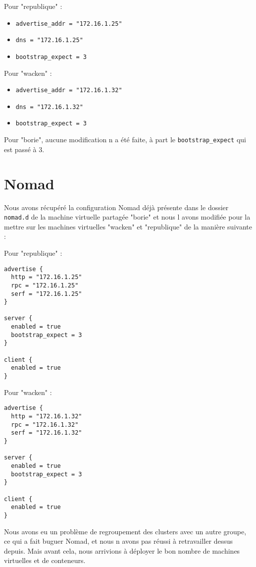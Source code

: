 \documentclass{report}
\begin{document}
Pour "republique" :
\begin{itemize}
    \item \texttt{advertise\_addr = "172.16.1.25"}
    \item \texttt{dns = "172.16.1.25"}
    \item \texttt{bootstrap\_expect = 3}
\end{itemize}

Pour "wacken" :
\begin{itemize}
    \item \texttt{advertise\_addr = "172.16.1.32"}
    \item \texttt{dns = "172.16.1.32"}
    \item \texttt{bootstrap\_expect = 3}
\end{itemize}

Pour "borie", aucune modification n a été faite, à part le \texttt{bootstrap\_expect} qui est passé à 3.

\section{Nomad}
Nous avons récupéré la configuration Nomad déjà présente dans le dossier \texttt{nomad.d} de la machine virtuelle partagée "borie" et nous l avons modifiée pour la mettre sur les machines virtuelles "wacken" et "republique" de la manière suivante :

\newpage
Pour "republique" :
\begin{verbatim}
advertise {
  http = "172.16.1.25"
  rpc = "172.16.1.25"
  serf = "172.16.1.25"
}

server {
  enabled = true
  bootstrap_expect = 3
}

client {
  enabled = true
}
\end{verbatim}

Pour "wacken" :
\begin{verbatim}
advertise {
  http = "172.16.1.32"
  rpc = "172.16.1.32"
  serf = "172.16.1.32"
}

server {
  enabled = true
  bootstrap_expect = 3
}

client {
  enabled = true
}
\end{verbatim}

Nous avons eu un problème de regroupement des clusters avec un autre groupe, ce qui a fait buguer Nomad, et nous n avons pas réussi à retravailler dessus depuis. Mais avant cela, nous arrivions à déployer le bon nombre de machines virtuelles et de conteneurs.

\newpage
\end{document}
